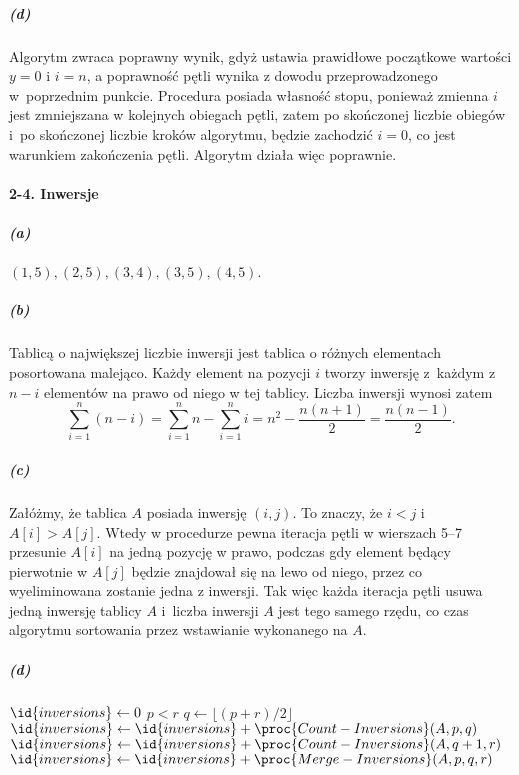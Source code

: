 \subparagraph{(d)}
Algorytm zwraca poprawny wynik, gdyż ustawia prawidłowe początkowe wartości $y=0$ i $i=n$, a poprawność pętli  wynika z dowodu przeprowadzonego w~poprzednim punkcie. Procedura posiada własność stopu, ponieważ zmienna $i$ jest zmniejszana w kolejnych obiegach pętli, zatem po skończonej liczbie obiegów i~po skończonej liczbie kroków algorytmu, będzie zachodzić $i=0$, co jest warunkiem zakończenia pętli. Algorytm działa więc poprawnie.

\paragraph{2-4. Inwersje}

\subparagraph{(a)}
$(1,5),(2,5),(3,4),(3,5),(4,5).$

\subparagraph{(b)}
Tablicą o największej liczbie inwersji jest tablica o różnych elementach posortowana malejąco. Każdy element na pozycji $i$ tworzy inwersję z~każdym z~$n-i$ elementów na prawo od niego w tej tablicy. Liczba inwersji wynosi zatem
\[
	\sum_{i=1}^n(n-i) = \sum_{i=1}^nn-\sum_{i=1}^ni = n^2-\frac{n(n+1)}{2} = \frac{n(n-1)}{2}.
\]

\subparagraph{(c)}
Załóżmy, że tablica $A$ posiada inwersję $(i,j)$. To znaczy, że $i<j$ i~$A[i]>A[j]$. Wtedy w procedurze  pewna iteracja pętli  w wierszach 5--7 przesunie $A[i]$ na jedną pozycję w prawo, podczas gdy element będący pierwotnie w $A[j]$ będzie znajdował się na lewo od niego, przez co wyeliminowana zostanie jedna z inwersji. Tak więc każda iteracja pętli  usuwa jedną inwersję tablicy $A$ i~liczba inwersji $A$ jest tego samego rzędu, co czas algorytmu sortowania przez wstawianie wykonanego na $A$.

\subparagraph{(d)}
\begin{codebox}
\li $\id{inversions}\gets 0$
\li \If $p<r$
\li     \Then
            $q\gets\lfloor(p+r)/2\rfloor$
\li         $\id{inversions}\gets\id{inversions}+\proc{Count-Inversions}(A,p,q)$
\li         $\id{inversions}\gets\id{inversions}+\proc{Count-Inversions}(A,q+1,r)$
\li         $\id{inversions}\gets\id{inversions}+\proc{Merge-Inversions}(A,p,q,r)$
        \End
\li \Return {}
\end{codebox}

